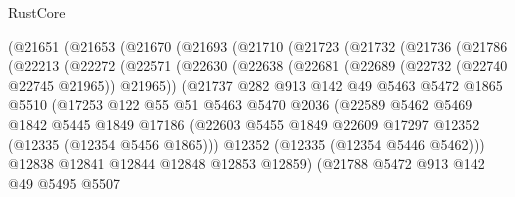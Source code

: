 \begin{lexlean}{RustCore}
\begin{coremodule}
        (@21651
          (@21653
            (@21670
              (@21693
                (@21710
                  (@21723
                    (@21732
                      (@21736
                        (@21786
                          (@22213
                            (@22272
                              (@22571
                                (@22630
                                  (@22638
                                    (@22681 (@22689 (@22732 (@22740 @22745 @21965)) @21965))
                                    (@21737
                                      @282
                                      @913
                                      @142
                                      @49
                                      @5463
                                      @5472
                                      @1865
                                      @5510
                                      (@17253
                                        @122
                                        @55
                                        @51
                                        @5463
                                        @5470
                                        @2036
                                        (@22589
                                          @5462
                                          @5469
                                          @1842
                                          @5445
                                          @1849
                                          @17186
                                          (@22603
                                            @5455
                                            @1849
                                            @22609
                                            @17297
                                            @12352
                                            (@12335 (@12354 @5456 @1865)))
                                          @12352
                                          (@12335 (@12354 @5446 @5462)))
                                        @12838
                                        @12841
                                        @12844
                                        @12848
                                        @12853
                                        @12859)
                                      (@21788
                                        @5472
                                        @913
                                        @142
                                        @49
                                        @5495
                                        @5507

\end{coremodule}
\end{lexlean}
